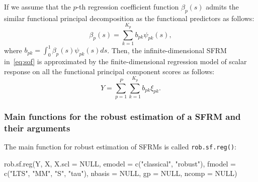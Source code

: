 If we assume that the $p$-th regression coefficient function $\beta_p(s)$ admits the similar functional principal decomposition as the functional predictors as follows:
\begin{equation*}
\beta_p(s) = \sum_{k=1}^{K_p} b_{pk} \psi_{pk}(s),
\end{equation*}
where $b_{pk} = \int_0^1 \beta_p(s) \psi_{pk}(s) ds$. Then, the infinite-dimensional SFRM in~\eqref{eq:sof} is approximated by the finite-dimensional regression model of scalar response on all the functional principal component scores as follows:
\begin{equation*}
Y = \sum_{p=1}^P \sum_{k=1}^{K_p} b_{pk} \xi_{pk}.
\end{equation*}

\subsubsection*{Main functions for the robust estimation of a SFRM and their arguments}

The main function for robust estimation of SFRMs is called \texttt{rob.sf.reg()}:
\begin{smallexample}
\begin{smallverbatim}
rob.sf.reg(Y, X, X.scl = NULL, emodel = c("classical", "robust"),
fmodel = c("LTS", "MM", "S", "tau"), nbasis = NULL, gp = NULL, ncomp = NULL)
\end{smallverbatim}
\end{smallexample}

